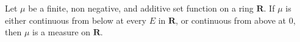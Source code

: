 Let $\mu$ be a finite, non negative, and additive set function on a ring $\mathbf{R}$. If $\mu$ is either continuous from below at every $E$ in $\mathbf{R}$, or continuous from above at $0$, then $\mu$ is a measure on $\mathbf{R}$.
